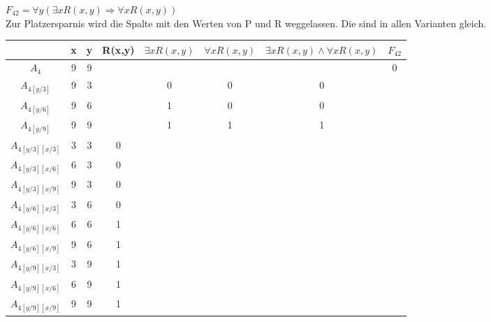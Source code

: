 \documentclass[10pt,a4paper,oneside,ngerman,numbers=noenddot]{scrartcl}
\begin{document}
\subsubsection{} %
$F_{42} = \forall y (\exists x R(x,y) \Rightarrow \forall x R(x,y))$\\
Zur Platzersparnis wird die Spalte mit den Werten von P und R weggelassen. Die sind in allen Varianten gleich.\\
\begin{tabular}{c|c|c|c|c|c|c|c}
& x & y & R(x,y) & $\exists x R(x,y)$ & $\forall x R(x,y)$ & $ \exists x R(x,y) \wedge \forall x R(x,y)$ & $F_{42}$ \\
\hline
$A_{4}$ & 9 & 9 & & & & & 0 \\
\hline
$A_{4[y/3]}$ & 9 & 3 & & 0 & 0 & 0 & \\
$A_{4[y/6]}$ & 9 & 6 & & 1 & 0 & 0 & \\
$A_{4[y/9]}$ & 9 & 9 & & 1 & 1 & 1 & \\ 
\hline
$A_{4[y/3][x/3]}$ & 3 & 3 & 0 & & & & \\
$A_{4[y/3][x/6]}$ & 6 & 3 & 0 & & & & \\
$A_{4[y/3][x/9]}$ & 9 & 3 & 0 & & & & \\
\hline
$A_{4[y/6][x/3]}$ & 3 & 6 & 0 & & & & \\
$A_{4[y/6][x/6]}$ & 6 & 6 & 1 & & & & \\
$A_{4[y/6][x/9]}$ & 9 & 6 & 1 & & & & \\
\hline
$A_{4[y/9][x/3]}$ & 3 & 9 & 1 & & & & \\
$A_{4[y/9][x/6]}$ & 6 & 9 & 1 & & & & \\
$A_{4[y/9][x/9]}$ & 9 & 9 & 1 & & & & \\
\end{tabular}
\end{document}
